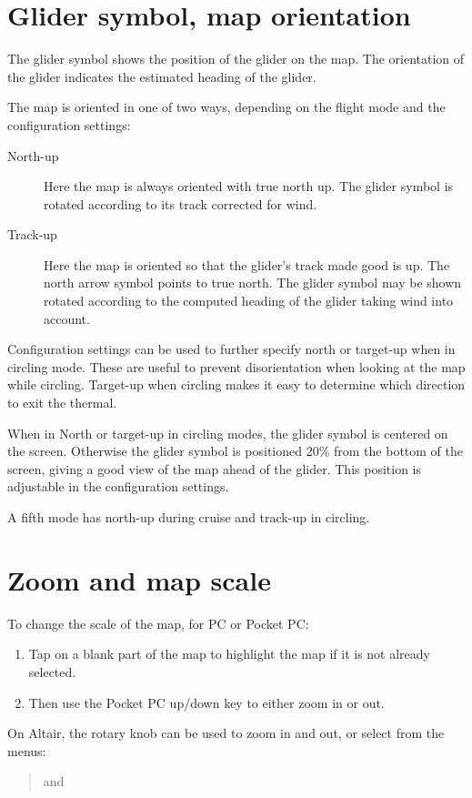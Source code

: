 \documentclass[a4paper,12pt]{refrep}
\begin{document}
\section{Glider symbol, map orientation}
The glider symbol shows the position of the glider on the map.  The
orientation of the glider indicates the estimated heading of the
glider.

The map is oriented in one of two ways, depending on the flight mode
and the configuration settings:
\begin{description}
\item[North-up]  Here the map is always oriented with true north up.
  The glider symbol is rotated according to its track corrected for wind.
\item[Track-up]  Here the map is oriented so that the glider's track
  made good is up.  The north arrow symbol points to true north.  
  The glider symbol may be shown rotated according to the computed
  heading of the glider taking wind into account.
\end{description}

Configuration settings can be used to further specify north or
target-up when in circling mode.  These are useful to prevent
disorientation when looking at the map while circling.  Target-up when
circling makes it easy to determine which direction to exit the
thermal.

When in North or target-up in circling modes, the glider symbol is
centered on the screen.  Otherwise the glider symbol is positioned
20\% from the bottom of the screen, giving a good view of the map
ahead of the glider.  This position is adjustable in the configuration
settings.

A fifth mode has north-up during cruise and track-up in circling.

\section{Zoom and map scale}

To change the scale of the map, for PC or Pocket PC:
\begin{enumerate}
\item Tap on a blank part of the map to highlight the map if it is not already selected.
\item Then use the Pocket PC up/down key to either zoom in or out.
\end{enumerate}

On Altair, the rotary knob can be used to zoom in and out, or select
from the menus:
\begin{quote}
\blink{} and \blink{}
\end{quote}
\end{document}
